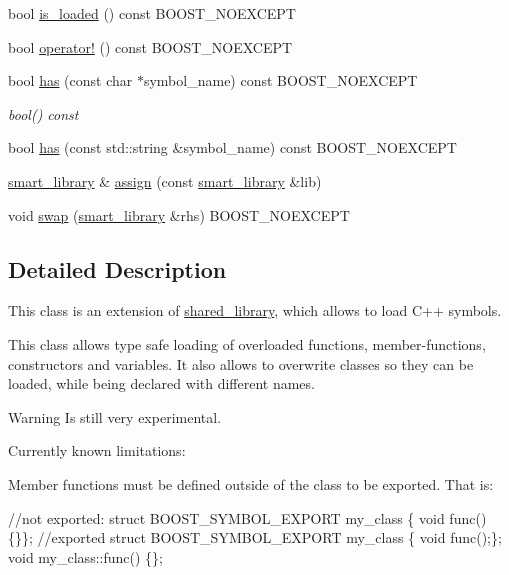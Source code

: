 \begin{DoxyCompactItemize}
\item 
bool \hyperlink{a00281_abe903598b2f65c04360d58943cc08255}{is\+\_\+loaded} () const B\+O\+O\+S\+T\+\_\+\+N\+O\+E\+X\+C\+E\+PT
\item 
bool \hyperlink{a00281_a57ba8c8f9d05415bb4698fa05bdd9153}{operator!} () const B\+O\+O\+S\+T\+\_\+\+N\+O\+E\+X\+C\+E\+PT
\item 
bool \hyperlink{a00281_a14d92d1f096a99ee1f59a6e6ac9c635c}{has} (const char $\ast$symbol\+\_\+name) const B\+O\+O\+S\+T\+\_\+\+N\+O\+E\+X\+C\+E\+PT
\begin{DoxyCompactList}\small\item\em bool() const \end{DoxyCompactList}\item 
bool \hyperlink{a00281_a9263542eeb995ab16f85901d90d1f868}{has} (const std\+::string \&symbol\+\_\+name) const B\+O\+O\+S\+T\+\_\+\+N\+O\+E\+X\+C\+E\+PT
\item 
\hyperlink{a00281}{smart\+\_\+library} \& \hyperlink{a00281_a0e0a4b60a6f388ad6d97bddee1b2b9d6}{assign} (const \hyperlink{a00281}{smart\+\_\+library} \&lib)
\item 
void \hyperlink{a00281_a437a1b5c2f71728147fcda529b553051}{swap} (\hyperlink{a00281}{smart\+\_\+library} \&rhs) B\+O\+O\+S\+T\+\_\+\+N\+O\+E\+X\+C\+E\+PT
\end{DoxyCompactItemize}


\subsection{Detailed Description}
This class is an extension of \hyperlink{a00271}{shared\+\_\+library}, which allows to load C++ symbols. 

This class allows type safe loading of overloaded functions, member-\/functions, constructors and variables. It also allows to overwrite classes so they can be loaded, while being declared with different names.

\begin{DoxyWarning}{Warning}
Is still very experimental.
\end{DoxyWarning}
Currently known limitations\+:

Member functions must be defined outside of the class to be exported. That is\+: 
\begin{DoxyCode}
\textcolor{comment}{//not exported:}
\textcolor{keyword}{struct }BOOST\_SYMBOL\_EXPORT my\_class \{ \textcolor{keywordtype}{void} func() \{\}\};
\textcolor{comment}{//exported}
\textcolor{keyword}{struct }BOOST\_SYMBOL\_EXPORT my\_class \{ \textcolor{keywordtype}{void} func();\};
\textcolor{keywordtype}{void} my\_class::func() \{\};
\end{DoxyCode}


